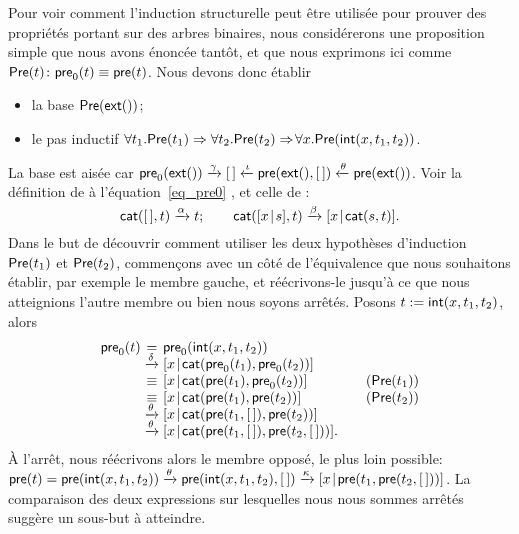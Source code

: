 Pour voir comment l'induction structurelle peut être utilisée pour
prouver des propriétés portant sur des arbres binaires, nous
considérerons une proposition simple que nous avons énoncée tantôt, et
que nous exprimons ici comme \(\textsf{Pre}({t}) \colon \textsf{pre}_0(t)
\equiv
\textsf{pre}(t)\).
Nous devons donc établir
\begin{itemize}

  \item la base \(\textsf{Pre}({\textsf{ext}()})\);

  \item le pas inductif \(\forall t_1.\textsf{Pre}({t_1}) \Rightarrow
    \forall t_2.\textsf{Pre}({t_2}) \Rightarrow \! \forall
    x.\textsf{Pre}({\textsf{int}(x,t_1,t_2)})\).

\end{itemize}
La base est aisée car \(\textsf{pre}_0(\textsf{ext}())
\xrightarrow{\smash{\gamma}} [\,] \xleftarrow{\smash{\iota}}
\textsf{pre}(\textsf{ext}(),[\,]) \xleftarrow{\smash{\theta}}
\textsf{pre}(\textsf{ext}())\). Voir la définition de  à
l'équation~\eqref{eq_pre0} , et celle de
:
\begin{equation*}
\textsf{cat}([\,],t) \xrightarrow{\smash{\alpha}} t;
\qquad
\textsf{cat}([{x}\!\mid\!{s}],t) \xrightarrow{\smash{\beta}}
[{x}\!\mid\!{\textsf{cat}(s,t)}].
\end{equation*}
Dans le but de découvrir comment utiliser les deux hypothèses
d'induction \(\textsf{Pre}({t_1})\) et
\(\textsf{Pre}({t_2})\), commençons avec un côté
de l'équivalence que nous souhaitons établir, par exemple le membre
gauche, et réécrivons-le jusqu'à ce que nous atteignions l'autre
membre ou bien nous soyons arrêtés. Posons \(t :=
\textsf{int}(x,t_1,t_2)\), alors
\begin{equation*}
\begin{array}{@{}r@{\;}c@{\;}l@{\qquad}r@{}}
\fun{pre}_0(t)
& = & \fun{pre}_0(\fun{int}(x,t_1,t_2))\\
& \xrightarrow{\smash{\delta}}
& \cons{x}{\fun{cat}(\fun{pre}_0(t_1), \fun{pre}_0(t_2))}\\
& \equiv & \cons{x}{\fun{cat}(\fun{pre}(t_1), \fun{pre}_0(t_2))}
& (\pred{Pre}{t_1})\\
& \equiv & \cons{x}{\fun{cat}(\fun{pre}(t_1), \fun{pre}(t_2))}
& (\pred{Pre}{t_2})\\
& \xrightarrow{\smash{\theta}}
& \cons{x}{\fun{cat}(\fun{pre}(t_1,\el), \fun{pre}(t_2))}\\
& \xrightarrow{\smash{\theta}}
& \cons{x}{\fun{cat}(\fun{pre}(t_1,\el), \fun{pre}(t_2,\el))}.
\end{array}
\end{equation*}
À l'arrêt, nous réécrivons alors le membre opposé, le plus loin
possible: \(\textsf{pre}(t) = \textsf{pre}(\textsf{int}(x,t_1,t_2))
\xrightarrow{\smash{\theta}} \textsf{pre}(\textsf{int}(x,t_1,t_2),[\,])
\xrightarrow{\smash{\kappa}}
[{x}\!\mid\!{\textsf{pre}(t_1,\textsf{pre}(t_2,[\,]))}]\). La
comparaison des deux expressions sur lesquelles nous nous sommes
arrêtés suggère un sous-but à atteindre.

